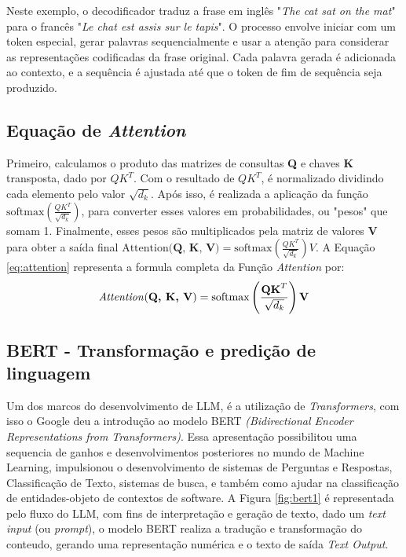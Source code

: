 Neste exemplo, o decodificador traduz a frase em inglês "\textit{The cat sat on the mat}" para o francês "\textit{Le chat est assis sur le tapis}". O processo envolve iniciar com um token especial, gerar palavras sequencialmente e usar a atenção para considerar as representações codificadas da frase original. Cada palavra gerada é adicionada ao contexto, e a sequência é ajustada até que o token de fim de sequência seja produzido.


\subsection*{Equação de \textit{Attention}}
Primeiro, calculamos o produto das matrizes de consultas \textbf{Q} e chaves \textbf{K} transposta, dado por \( QK^T \). Com o resultado de \( QK^T \), é normalizado dividindo cada elemento pelo valor \(\sqrt{d_k}\). Após isso, é realizada a aplicação da função \(\text{softmax}\left(\frac{QK^T}{\sqrt{d_k}}\right)\), para converter esses valores em probabilidades, ou "pesos" que somam 1.
Finalmente, esses pesos são multiplicados pela matriz de valores \textbf{V} para obter a saída final
\(\text{Attention}\textbf{(Q, K, V}) = \text{softmax}\left(\frac{QK^T}{\sqrt{d_k}}\right) V\).
A Equação \ref{eq:attention} representa a formula completa da Função \textit{Attention} por:
\begin{equation}
\text{\textit{Attention}}(\textbf{Q, K, V}) = \text{softmax}\left(\frac{\textbf{QK}^T}{\sqrt{d_k}}\right) \textbf{V}
\label{eq:attention}
\end{equation}





\subsection{BERT - Transformação e predição de linguagem }
\label{bert}
Um dos marcos do desenvolvimento de LLM, é a utilização de \textit{Transformers}, com isso o Google \cite{DBLP:journals/corr/abs-1810-04805} deu a introdução ao modelo BERT \textit{(Bidirectional Encoder Representations from Transformers)}. Essa apresentação possibilitou uma sequencia de ganhos e desenvolvimentos posteriores no mundo de Machine Learning, impulsionou o desenvolvimento de sistemas de Perguntas e Respostas, Classificação de Texto, sistemas de busca, e também como ajudar na classificação de entidades-objeto de contextos de  software. A Figura \ref{fig:bert1} é representada pelo fluxo do LLM, com fins de interpretação e geração de texto, dado um \textit{text input} (ou \textit{prompt}), o modelo BERT realiza a tradução e transformação do conteudo, gerando uma representação numérica e o texto de saída \textit{Text Output}.

